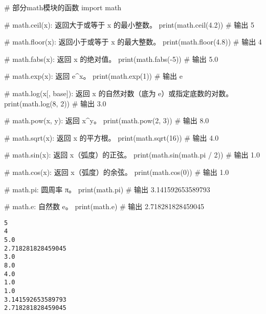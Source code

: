 \documentclass[
  letterpaper,
  DIV=11,
  numbers=noendperiod]{scrreprt}
\newenvironment{Shaded}{\begin{snugshade}}{\end{snugshade}}
\newcommand{\BuiltInTok}[1]{\textcolor[rgb]{0.00,0.23,0.31}{#1}}
\newcommand{\CommentTok}[1]{\textcolor[rgb]{0.37,0.37,0.37}{#1}}
\newcommand{\DecValTok}[1]{\textcolor[rgb]{0.68,0.00,0.00}{#1}}
\newcommand{\FloatTok}[1]{\textcolor[rgb]{0.68,0.00,0.00}{#1}}
\newcommand{\ImportTok}[1]{\textcolor[rgb]{0.00,0.46,0.62}{#1}}
\newcommand{\NormalTok}[1]{\textcolor[rgb]{0.00,0.23,0.31}{#1}}
\newcommand{\OperatorTok}[1]{\textcolor[rgb]{0.37,0.37,0.37}{#1}}
\begin{document}
\begin{Shaded}
\begin{Highlighting}[]
\CommentTok{\# 部分math模块的函数}
\ImportTok{import}\NormalTok{ math}

\CommentTok{\# math.ceil(x): 返回大于或等于 x 的最小整数。}
\BuiltInTok{print}\NormalTok{(math.ceil(}\FloatTok{4.2}\NormalTok{))  }\CommentTok{\# 输出 5}

\CommentTok{\# math.floor(x): 返回小于或等于 x 的最大整数。}
\BuiltInTok{print}\NormalTok{(math.floor(}\FloatTok{4.8}\NormalTok{))  }\CommentTok{\# 输出 4}

\CommentTok{\# math.fabs(x): 返回 x 的绝对值。}
\BuiltInTok{print}\NormalTok{(math.fabs(}\OperatorTok{{-}}\DecValTok{5}\NormalTok{))  }\CommentTok{\# 输出 5.0}

\CommentTok{\# math.exp(x): 返回 e\^{}x。}
\BuiltInTok{print}\NormalTok{(math.exp(}\DecValTok{1}\NormalTok{))  }\CommentTok{\# 输出 e}

\CommentTok{\# math.log(x[, base]): 返回 x 的自然对数（底为 e）或指定底数的对数。}
\BuiltInTok{print}\NormalTok{(math.log(}\DecValTok{8}\NormalTok{, }\DecValTok{2}\NormalTok{))  }\CommentTok{\# 输出 3.0}

\CommentTok{\# math.pow(x, y): 返回 x\^{}y。}
\BuiltInTok{print}\NormalTok{(math.}\BuiltInTok{pow}\NormalTok{(}\DecValTok{2}\NormalTok{, }\DecValTok{3}\NormalTok{))  }\CommentTok{\# 输出 8.0}

\CommentTok{\# math.sqrt(x): 返回 x 的平方根。}
\BuiltInTok{print}\NormalTok{(math.sqrt(}\DecValTok{16}\NormalTok{))  }\CommentTok{\# 输出 4.0}

\CommentTok{\# math.sin(x): 返回 x（弧度）的正弦。}
\BuiltInTok{print}\NormalTok{(math.sin(math.pi }\OperatorTok{/} \DecValTok{2}\NormalTok{))  }\CommentTok{\# 输出 1.0}

\CommentTok{\# math.cos(x): 返回 x（弧度）的余弦。}
\BuiltInTok{print}\NormalTok{(math.cos(}\DecValTok{0}\NormalTok{))  }\CommentTok{\# 输出 1.0}


\CommentTok{\# math.pi: 圆周率 π。}
\BuiltInTok{print}\NormalTok{(math.pi)  }\CommentTok{\# 输出 3.141592653589793}

\CommentTok{\# math.e: 自然数 e。}
\BuiltInTok{print}\NormalTok{(math.e)  }\CommentTok{\# 输出 2.718281828459045}
\end{Highlighting}
\end{Shaded}

\begin{verbatim}
5
4
5.0
2.718281828459045
3.0
8.0
4.0
1.0
1.0
3.141592653589793
2.718281828459045
\end{verbatim}
\end{document}
